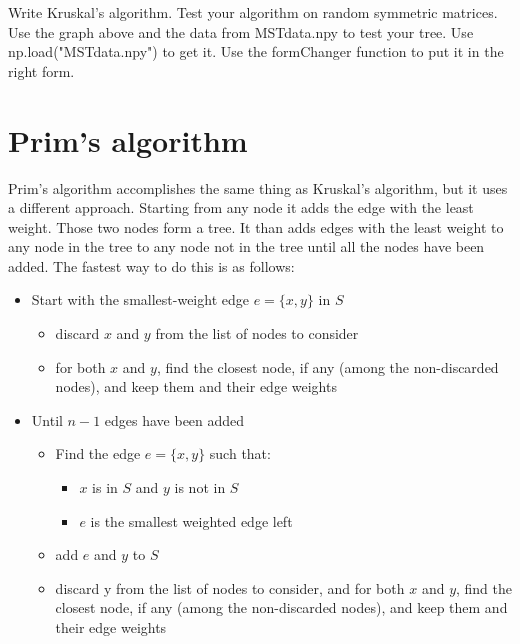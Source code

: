 \begin{problem}
Write Kruskal's algorithm.
Test your algorithm on random symmetric matrices.
Use the graph above and the data from MSTdata.npy to test your tree.
Use np.load("MSTdata.npy") to get it.
Use the formChanger function to put it in the right form.
\end{problem}

\section*{Prim's algorithm}

Prim's algorithm accomplishes the same thing as Kruskal's algorithm, but it uses a different approach.
Starting from any node it adds the edge with the least weight.
Those two nodes form a tree.
It than adds edges with the least weight to any node in the tree to any node not in the tree until all the nodes have been added.
The fastest way to do this is as follows:

\flushleft

\begin{itemize}


\item Start with the smallest-weight edge $e = \{x, y\}$ in $S$

\begin{itemize}

\item discard $x$ and $y$ from the list of nodes to consider

\item for both $x$ and $y$, find the closest node, if any (among the non-discarded nodes), and keep them and their edge weights

\end{itemize}

\item Until $n-1$ edges have been added

\begin{itemize}

\item Find the edge $e = \{x, y\}$ such that:

\begin{itemize}

\item $x$ is in $S$ and $y$ is not in $S$

\item $e$ is the smallest weighted edge left

\end{itemize}

\item add $e$ and $y$ to $S$

\item discard y from the list of nodes to consider, and for both $x$ and $y$, find the closest node, if any (among the non-discarded nodes), and keep them and their edge weights

\end{itemize}

\end{itemize}

